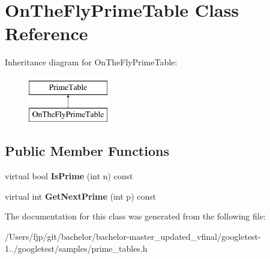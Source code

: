 \hypertarget{class_on_the_fly_prime_table}{}\section{On\+The\+Fly\+Prime\+Table Class Reference}
\label{class_on_the_fly_prime_table}
Inheritance diagram for On\+The\+Fly\+Prime\+Table\+:\begin{figure}[H]
\begin{center}
\leavevmode
\includegraphics[height=2.000000cm]{class_on_the_fly_prime_table}
\end{center}
\end{figure}
\subsection*{Public Member Functions}
\begin{DoxyCompactItemize}
\item 
\mbox{\label{class_on_the_fly_prime_table_a1d49b78f79e018441289e79d75680067}} 
virtual bool {\bfseries Is\+Prime} (int n) const
\item 
\mbox{\label{class_on_the_fly_prime_table_a5a4644fedd95d33136723f33b9302bfc}} 
virtual int {\bfseries Get\+Next\+Prime} (int p) const
\end{DoxyCompactItemize}


The documentation for this class was generated from the following file\+:\begin{DoxyCompactItemize}
\item 
/\+Users/fjp/git/bachelor/bachelor-\/master\+\_\+updated\+\_\+vfinal/googletest-\/1../googletest/samples/prime\+\_\+tables.\+h\end{DoxyCompactItemize}
